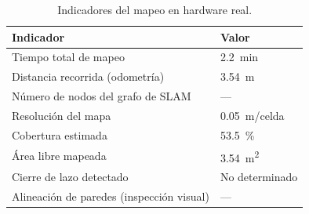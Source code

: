 \begin{table}[H]
\centering
\caption{Indicadores del mapeo en hardware real.}
\label{tab:slam_real_indicadores}
\begin{tabular}{ll}
\hline
\textbf{Indicador} & \textbf{Valor} \\
\hline
Tiempo total de mapeo                  & 2.2~min \\
Distancia recorrida (odometría)        & 3.54~m \\
Número de nodos del grafo de SLAM      & --- \\
Resolución del mapa                    & 0.05~m/celda \\
Cobertura estimada                     & 53.5~\% \\
Área libre mapeada                     & 3.54~m\textsuperscript{2} \\
Cierre de lazo detectado               & No determinado \\
Alineaci\'on de paredes (inspecci\'on visual) & --- \\
\hline
\end{tabular}
\end{table}
